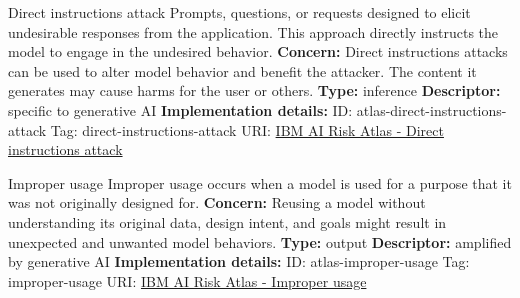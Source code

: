 \documentclass[a4paper,12pt]{article}
\begin{document}
\begin{definitionbox}{Direct instructions attack}
Prompts, questions, or requests designed to elicit undesirable responses from the application. This approach directly instructs the model to engage in the undesired behavior.\newline\newline
\textbf{Concern: }Direct instructions attacks can be used to alter model behavior and benefit the attacker. The content it generates may cause harms for the user or others.\newline\newline
\textbf{Type: }inference\newline
\textbf{Descriptor: }specific to generative AI \newline\newline
\textbf{Implementation details: } \newline
ID: atlas-direct-instructions-attack \newline
Tag: direct-instructions-attack \newline
URI:  \href{https://www.ibm.com/docs/en/watsonx/saas?topic=SSYOK8/wsj/ai-risk-atlas/direct-instructions-attack.html}{IBM AI Risk Atlas - Direct instructions attack}\newline
\end{definitionbox}
\begin{definitionbox}{Improper usage}
Improper usage occurs when a model is used for a purpose that it was not originally designed for.\newline\newline
\textbf{Concern: }Reusing a model without understanding its original data, design intent, and goals might result in unexpected and unwanted model behaviors.\newline\newline
\textbf{Type: }output\newline
\textbf{Descriptor: }amplified by generative AI \newline\newline
\textbf{Implementation details: } \newline
ID: atlas-improper-usage \newline
Tag: improper-usage \newline
URI:  \href{https://www.ibm.com/docs/en/watsonx/saas?topic=SSYOK8/wsj/ai-risk-atlas/improper-usage.html}{IBM AI Risk Atlas - Improper usage}\newline
\end{definitionbox}
\end{document}
